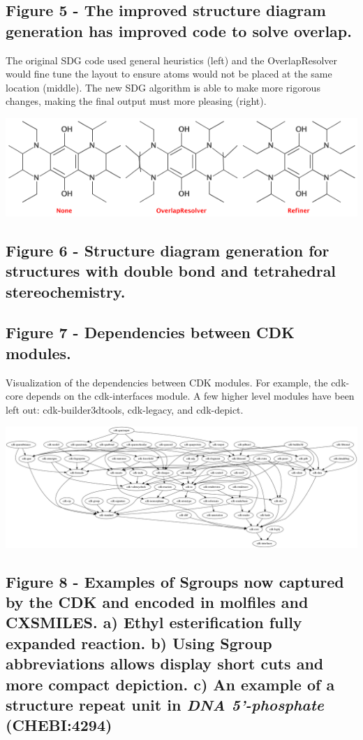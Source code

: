 \documentclass[10pt]{bmcart}
\begin{document}
\begin{backmatter}
\subsection*{Figure 5 - The improved structure diagram generation has improved
code to solve overlap.}\label{fig:sdg}
The original SDG code used general heuristics (left) and the
OverlapResolver would fine tune the layout to ensure atoms would not be placed
at the same location (middle). The new SDG algorithm is able to
make more rigorous changes, making the final output must more pleasing
(right).

\includegraphics[width=\textwidth]{sdg.png}

\subsection*{Figure 6 - Structure diagram generation for structures with
double bond and tetrahedral stereochemistry.}\label{fig:sdgstereo}


  \subsection*{Figure 7 - Dependencies between CDK modules.}\label{fig:deps}
      Visualization of the dependencies between CDK modules. For example,
      the cdk-core depends on the cdk-interfaces module. A few higher level
      modules have been left out: cdk-builder3dtools, cdk-legacy, and
      cdk-depict.

\includegraphics[width=\textwidth]{cdkDeps.png}

\subsection*{Figure 8 - Examples of Sgroups now captured by the CDK and encoded in molfiles and CXSMILES. a) Ethyl esterification fully expanded reaction. b) Using Sgroup abbreviations allows display short cuts and more compact depiction. c) An example of a structure repeat unit in \textit{DNA 5'-phosphate} (\textbf{CHEBI:4294})}
\label{fig:sgroups}
      


\end{backmatter}
\end{document}
